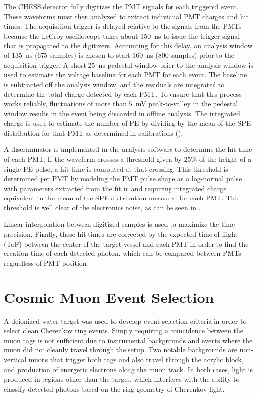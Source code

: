 The CHESS detector fully digitizes the PMT signals for each triggered event.
These waveforms must then analyzed to extract individual PMT charges and hit times. 
The acquisition trigger is delayed relative to the signals from the PMTs because the LeCroy oscilloscope takes about 150~ns to issue the trigger signal that is propagated to the digitizers. 
Accounting for this delay, an analysis window of $135$~ns (675 samples) is chosen to start $160$~ns (800 samples) prior to the acquisition trigger. 
A short 25~ns pedestal window prior to the analysis window is used to estimate the voltage baseline for each PMT for each event.
The baseline is subtracted off the analysis window, and the residuals are integrated to determine the total charge detected by each PMT. 
To ensure that this process works reliably, fluctuations of more than $5$~mV peak-to-valley in the pedestal window results in the event being discarded in offline analysis.  
The integrated charge is used to estimate the number of PE by dividing by the mean of the SPE distribution for that PMT as determined in calibrations ().

A discriminator is implemented in the analysis software to determine the hit time of each PMT.
If the waveform crosses a threshold given by $25\%$ of the height of a single PE pulse, a hit time is computed at that crossing.
This threshold is determined per PMT by modeling the PMT pulse shape as a log-normal pulse with parameters extracted from the fit in  and requiring integrated charge equivalent to the mean of the SPE distribution measured for each PMT.
This threshold is well clear of the electronics noise, as can be seen in . 

Linear interpolation between digitized samples is used to maximize the time precision. 
Finally, these hit times are corrected by the expected time of flight (ToF) between the center of the target vessel and each PMT in order to find the creation time of each detected photon, which can be compared between PMTs regardless of PMT position.


\section{Cosmic Muon Event Selection}\label{s:event}

A deionized water target was used to develop event selection criteria in order to select clean Cherenkov ring events.
Simply requiring a coincidence between the muon tags is not sufficient due to instrumental backgrounds and events where the muon did not cleanly travel through the setup.
Two notable backgrounds are non-vertical muons that trigger both tags and also travel through the acrylic block, and production of energetic electrons along the muon track.
In both cases, light is produced in regions other than the target, which interferes with the ability to classify detected photons based on the ring geometry of Cherenkov light.

